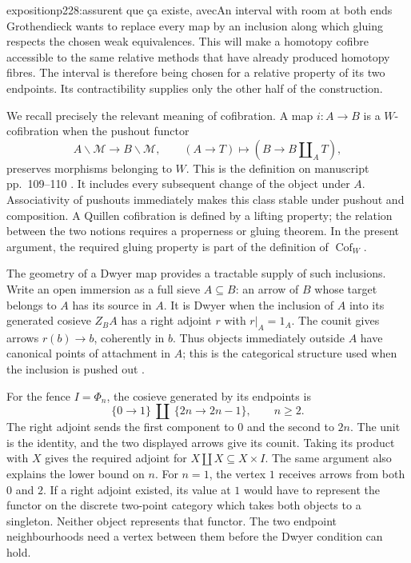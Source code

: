 \begin{dcomment}{exposition}{p228:assurent que ça existe, avec}{An interval with room at both ends}
Grothendieck wants to replace every map by an inclusion along which gluing respects the chosen weak equivalences. This will make a homotopy cofibre accessible to the same relative methods that have already produced homotopy fibres. The interval is therefore being chosen for a relative property of its two endpoints. Its contractibility supplies only the other half of the construction.

We recall precisely the relevant meaning of cofibration. A map $i:A\to B$ is a $W$-cofibration when the pushout functor
\[
 A\backslash\mathcal M\longrightarrow B\backslash\mathcal M,
 \qquad (A\to T)\longmapsto(B\to B\amalg_A T),
\]
preserves morphisms belonging to $W$. This is the definition on manuscript pp.~109--110 \citep[Definition~2(c)]{Grothendieck1990XII}. It includes every subsequent change of the object under $A$. Associativity of pushouts immediately makes this class stable under pushout and composition. A Quillen cofibration is defined by a lifting property; the relation between the two notions requires a properness or gluing theorem. In the present argument, the required gluing property is part of the definition of $\operatorname{Cof}_W$.

The geometry of a Dwyer map provides a tractable supply of such inclusions. Write an open immersion as a full sieve $A\subseteq B$: an arrow of $B$ whose target belongs to $A$ has its source in $A$. It is Dwyer when the inclusion of $A$ into its generated cosieve $Z_BA$ has a right adjoint $r$ with $r|_A=1_A$. The counit gives arrows $r(b)\to b$, coherently in $b$. Thus objects immediately outside $A$ have canonical points of attachment in $A$; this is the categorical structure used when the inclusion is pushed out \citep[Definition~4.1]{Thomason1980}.

For the fence $I=\Phi_n$, the cosieve generated by its endpoints is
\[
 \{0\longrightarrow1\}\ \amalg\
 \{2n\longrightarrow2n-1\},\qquad n\geq2.
\]
The right adjoint sends the first component to $0$ and the second to $2n$. The unit is the identity, and the two displayed arrows give its counit. Taking its product with $X$ gives the required adjoint for $X\amalg X\subseteq X\times I$. The same argument also explains the lower bound on $n$. For $n=1$, the vertex $1$ receives arrows from both $0$ and $2$. If a right adjoint existed, its value at $1$ would have to represent the functor on the discrete two-point category which takes both objects to a singleton. Neither object represents that functor. The two endpoint neighbourhoods need a vertex between them before the Dwyer condition can hold.


\end{dcomment}
